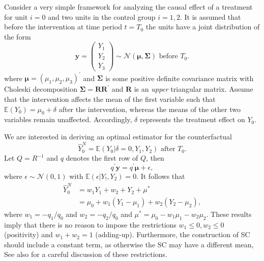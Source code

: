 Consider a very simple framework for analyzing the causal effect of a treatment for unit $i = 0$ and two units in the control group $i = 1,2$. It is assumed that before the intervention at time period $t = T_0$ the units have a joint distribution of the form 
\[
\boldsymbol{y} = \begin{pmatrix} Y_1\\ Y_2\\ Y_3 \end{pmatrix} \sim \mathcal{N}(\boldsymbol{\mu},\boldsymbol{\Sigma})
\text{ before } T_0.
\] 
where $\boldsymbol{\mu} = \left(\mu_1, \mu_2, \mu_3  \right)^\prime$ and $\boldsymbol{\Sigma}$ is some positive definite covariance matrix with Choleski decomposition $\boldsymbol{\Sigma} = \boldsymbol{R}\boldsymbol{R}^\prime$ and $\boldsymbol{R}$ is an \textit{upper} triangular matrix. Assume that the intervention affects the mean of the first variable such that $\mathbb{E}(Y_0) = \mu_0 + \delta$ after the intervention, whereas the means of the other two variables remain unaffected. Accordingly, $\delta$ represents the treatment effect on $Y_0$. 

We are interested in deriving an optimal estimator for the counterfactual
\[
\widehat{Y}^{N}_{0} = \mathbb{E}(Y_0 | \delta = 0, Y_1, Y_2) \text{ after } T_0. 
\] 
Let $Q = R^{-1}$ and $q$ denotes the first row of $Q$, then
\[
q^\prime \boldsymbol{y} = q^\prime \boldsymbol{\mu} + \epsilon,
\] 
where $\epsilon \sim \mathcal{N}(0,1)$ with $\mathbb{E}(\epsilon | Y_!, Y_2) = 0.$ It follows that  
\begin{equation*}
	\begin{split}
		\widehat{Y}^{N}_{0} & = w_1 Y_1 + w_2 + Y_2 + \mu^* \\
		& = \mu_0 + w_1(Y_1 - \mu_1) + w_2(Y_2 - \mu_2),
	\end{split}
\end{equation*}
where $w_1 = -q_1/q_0$ and $w_2 = -q_2/q_0$ and $\mu^* = \mu_0 - w_1\mu_1 -  w_2\mu_2$. These results imply that there is no reason to impose the restrictions $w_1 \leq 0, w_2 \leq 0$ (positivity) and $w_1 + w_2 = 1$ (adding-up). Furthermore, the construction of \ac{SC} should include a constant term, as otherwise the \ac{SC} may have a different mean, See also \cite{doudchenko:2016} for a careful discussion of these restrictions.


